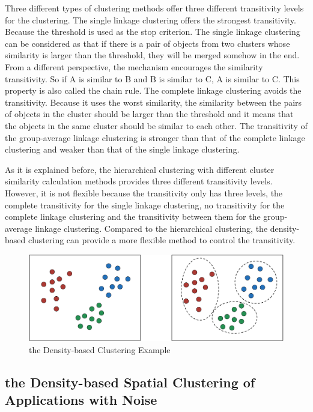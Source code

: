 Three different types of clustering methods offer three different transitivity levels for the clustering. The single linkage clustering offers the strongest transitivity. Because the threshold is used as the stop criterion. The single linkage clustering can be considered as that if there is a pair of objects from two clusters whose similarity is larger than the threshold, they will be merged somehow in the end. From a different perspective, the mechanism encourages the similarity transitivity. So if A is similar to B and B is similar to C, A is similar to C. This property is also called the chain rule. The complete linkage clustering avoids the transitivity. Because it uses the worst similarity, the similarity between the pairs of objects in the cluster should be larger than the threshold and it means that the objects in the same cluster should be similar to each other. The transitivity of the group-average linkage clustering is stronger than that of the complete linkage clustering and weaker than  that of the single linkage clustering. \newline

As it is explained before, the hierarchical clustering with different cluster similarity calculation methods provides three different transitivity levels. However, it is not flexible because the transitivity only has three levels, the complete transitivity for the single linkage clustering, no transitivity for the complete linkage clustering and the transitivity between them for the group-average linkage clustering. Compared to the hierarchical clustering, the density-based clustering can provide a more flexible method to control the transitivity. 
\begin{figure}
\centering
\includegraphics[scale=0.3]{density-basedClustering.pdf}
\caption{the Density-based Clustering Example}
\end{figure}



\subsection{the Density-based Spatial Clustering of Applications with Noise}

